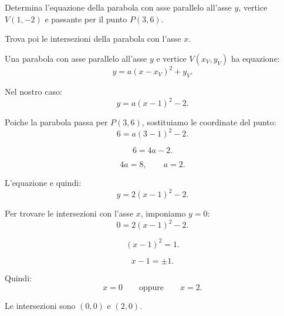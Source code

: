 
\begin{esercizio}
Determina l'equazione della parabola con asse parallelo all'asse \(y\),
vertice \(V(1,-2)\) e passante per il punto \(P(3,6)\).

Trova poi le intersezioni della parabola con l'asse \(x\).
\end{esercizio}

\begin{soluzione}
Una parabola con asse parallelo all'asse \(y\) e vertice \(V(x_V,y_V)\) ha
equazione:
\[
y=a(x-x_V)^2+y_V.
\]

Nel nostro caso:
\[
y=a(x-1)^2-2.
\]

Poiche la parabola passa per \(P(3,6)\), sostituiamo le coordinate del punto:
\[
6=a(3-1)^2-2.
\]

\[
6=4a-2.
\]

\[
4a=8,
\qquad a=2.
\]

L'equazione e quindi:
\[
y=2(x-1)^2-2.
\]

Per trovare le intersezioni con l'asse \(x\), imponiamo \(y=0\):
\[
0=2(x-1)^2-2.
\]

\[
(x-1)^2=1.
\]

\[
x-1=\pm 1.
\]

Quindi:
\[
x=0
\qquad \text{oppure} \qquad
x=2.
\]

Le intersezioni sono \((0,0)\) e \((2,0)\).
\end{soluzione}
